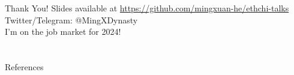 \documentclass{beamer}
\begin{document}
\begin{frame}{Thank You!}
    Slides available at \url{https://github.com/mingxuan-he/ethchi-talks}\\
    \bigskip
    Twitter/Telegram: @MingXDynasty\\ 
    \bigskip
    I'm on the job market for 2024!
 

\end{frame}

\section*{}

\begin{frame}[allowframebreaks]{References}
    \nocite{*}
    \printbibliography
\end{frame}
\end{document}
